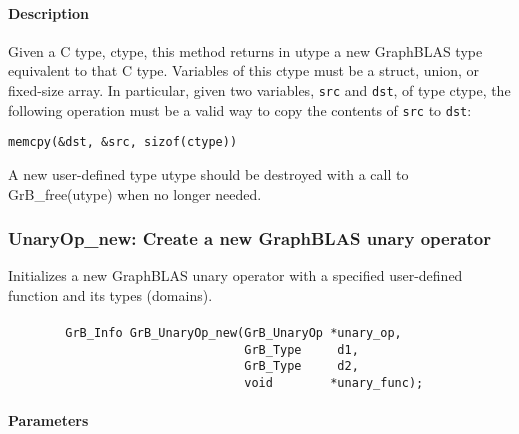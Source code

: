 \paragraph{Description}
Given a C type, {\sf ctype}, this method returns in {\sf utype} a new GraphBLAS type equivalent to that C type.
Variables of this {\sf ctype} must be a struct, union, or fixed-size array. In particular, given two variables,
{\tt src} and {\tt dst}, of type {\sf ctype}, the following operation must be a valid way to copy the contents of
{\tt src} to {\tt dst}:

\begin{center}
{\tt memcpy(\&dst, \&src, sizof({\sf ctype}))}
\end{center}

A new user-defined type {\sf utype} should be destroyed with a call to 
{\sf GrB\_free(utype)} when no longer needed.

\subsubsection{{\sf UnaryOp\_new}: Create a new GraphBLAS unary operator}

Initializes a new GraphBLAS unary operator with a specified user-defined 
function and its types (domains).

\paragraph{\syntax}

\begin{verbatim}
        GrB_Info GrB_UnaryOp_new(GrB_UnaryOp *unary_op,
                                 GrB_Type     d1,
                                 GrB_Type     d2,
                                 void        *unary_func);
\end{verbatim}

\paragraph{Parameters}

